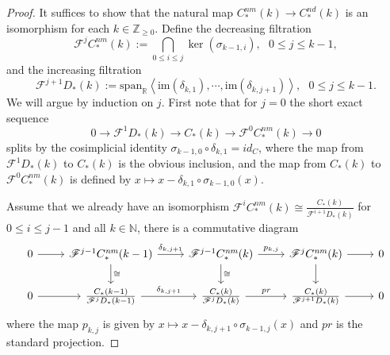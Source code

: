 \documentclass[a4paper]{article}
\numberwithin{equation}{section}
\begin{document}
\begin{proof}
It suffices to show that the natural map $C_\ast^\mathit{nm}(k)\rightarrow C_\ast^\mathit{nd}(k)$ is an isomorphism for each $k\in\mathbb{Z}_{\geq0}$. Define the decreasing filtration
\begin{equation}
\mathscr{F}^jC_\ast^\mathit{nm}(k):=\bigcap_{0\leq i\leq j}\ker(\sigma_{k-1,i}),\textrm{ }0\leq j\leq k-1,
\end{equation}
and the increasing filtration
\begin{equation}
\mathscr{F}^{j+1}D_\ast(k):=\mathrm{span}_\mathbb{R}\left\langle\mathrm{im}(\delta_{k,1}),\cdots,\mathrm{im}(\delta_{k,j+1})\right\rangle,\textrm{ }0\leq j\leq k-1.
\end{equation}
We will argue by induction on $j$. First note that for $j=0$ the short exact sequence
\begin{equation}
0\rightarrow\mathscr{F}^1D_\ast(k)\rightarrow C_\ast(k)\rightarrow\mathscr{F}^0C_\ast^\mathit{nm}(k)\rightarrow0
\end{equation}
splits by the cosimplicial identity $\sigma_{k-1,0}\circ\delta_{k,1}=\mathit{id}_C$, where the map from $\mathscr{F}^1D_\ast(k)$ to $C_\ast(k)$ is the obvious inclusion, and the map from $C_\ast(k)$ to $\mathscr{F}^0C_\ast^\mathit{nm}(k)$ is defined by $x\mapsto x-\delta_{k,1}\circ\sigma_{k-1,0}(x)$.

Assume that we already have an isomorphism $\mathscr{F}^iC_\ast^\mathit{nm}(k)\cong\frac{C_\ast(k)}{\mathscr{F}^{i+1}D_\ast(k)}$ for $0\leq i\leq j-1$ and all $k\in\mathbb{N}$, there is a commutative diagram
\begin{equation}\label{eq:diagram}
\begin{tikzcd}
	0 \arrow[r] &\mathscr{F}^{j-1}C_\ast^\mathit{nm}(k-1) \arrow[d,"\cong"] \arrow[r,"\delta_{k,j+1}"] &\mathscr{F}^{j-1}C_\ast^\mathit{nm}(k) \arrow[d, "\cong"] \arrow[r,"p_{k,j}"] &\mathscr{F}^jC_\ast^\mathit{nm}(k) \arrow[d] \arrow[r] &0 \\
	0 \arrow[r] &\frac{C_\ast(k-1)}{\mathscr{F}^{j}D_\ast(k-1)} \arrow[r, "\delta_{k,j+1}"] &\frac{C_\ast(k)}{\mathscr{F}^{j}D_\ast(k)} \arrow[r,"\mathit{pr}"] &\frac{C_\ast(k)}{\mathscr{F}^{j+1}D_\ast(k)} \arrow[r] &0
\end{tikzcd}
\end{equation}
where the map $p_{k,j}$ is given by $x\mapsto x-\delta_{k,j+1}\circ\sigma_{k-1,j}(x)$ and $\mathit{pr}$ is the standard projection. 


\end{proof}
\end{document}
